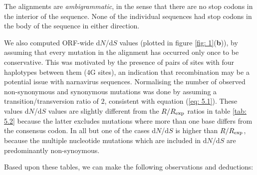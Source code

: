 \documentclass[unnumsec,webpdf,contemporary,large]{oup-authoring-template}%
\theoremstyle{thmstyleone}%
\theoremstyle{thmstyletwo}%
\theoremstyle{thmstylethree}%
\begin{document}
The alignments are \emph{ambigrammatic}, in the sense that there are no stop codons in the
interior of the sequence. None of the individual sequences had stop codons in the body of the
sequence in either direction.

We also computed ORF-wide d$N$/d$S$ values (plotted in figure \ref{fig: 1}({\bf b})),
by assuming that every mutation in the alignment has occurred only once to be conservative.
This was motivated by the presence of pairs of sites with four haplotypes between them ($4$G sites), an
indication that recombination may be a potential issue with narnavirus
sequences.  Normalising the number of observed non-synonymous and synonymous
mutations was done by assuming a transition/transversion ratio of $2$,
consistent with equation (\ref{eq: 5.1}). These values d$N$/d$S$ values are slightly
different from the $R/R_{\rm exp}$ ratios in table \ref{tab: 5.2} because the latter excludes
mutations where more than one base differs from the consensus codon. In all but one of the cases
d$N$/d$S$ is higher than $R/R_{\rm exp}$, because the multiple nucleotide mutations which are
included in d$N$/d$S$ are predominantly non-synoymous.

Based upon these tables, we can make the following observations and deductions:
\end{document}
